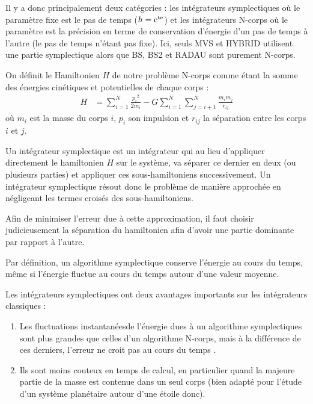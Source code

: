 Il y a donc principalement deux catégories : les intégrateurs symplectiques où le paramètre fixe est le pas de temps ($h=\mathrm{c^{te}}$) et les intégrateurs N-corps où le paramètre est la précision en terme de conservation d'énergie d'un pas de temps à l'autre (le pas de temps n'étant pas fixe). Ici, seuls MVS et HYBRID utilisent une partie symplectique alors que BS, BS2 et RADAU sont purement N-corps.

\bigskip

On définit le Hamiltonien $H$ de notre problème N-corps comme étant la somme des énergies cinétiques et potentielles de chaque corps : 
\begin{align}
H &= \sum_{i=1}^N\frac{{p_i}^2}{2m_i} -G\sum_{i=1}^N\sum_{j=i+1}^N\frac{m_im_j}{r_{ij}}
\end{align}
où $m_i$ est la masse du corps $i$, $p_i$ son impulsion et $r_{ij}$ la séparation entre les corps $i$ et $j$.

Un intégrateur symplectique est un intégrateur qui au lieu d'appliquer directement le hamiltonien $H$ sur le système, va séparer ce dernier en deux (ou plusieurs parties) et appliquer ces sous-hamiltoniens successivement. Un intégrateur symplectique résout donc le problème de manière approchée en négligeant les termes croisés des sous-hamiltoniens.

Afin de minimiser l'erreur due à cette approximation, il faut choisir judicieusement la séparation du hamiltonien afin d'avoir une partie dominante par rapport à l'autre.

Par définition, un algorithme symplectique conserve l'énergie au cours du temps, même si l'énergie fluctue au cours du temps autour d'une valeur moyenne. 

Les intégrateurs symplectiques ont deux avantages importants sur les intégrateurs classiques : 
\begin{enumerate}
\item Les fluctuations \og instantanées\fg de l'énergie dues à un algorithme symplectiques sont plus grandes que celles d'un algorithme N-corps, mais à la différence de ces derniers, l'erreur ne croit pas au cours du temps .
\item Ils sont moins couteux en temps de calcul, en particulier quand la majeure partie de la masse est contenue dans un seul corps (bien adapté pour l'étude d'un système planétaire autour d'une étoile donc).
\end{enumerate}

